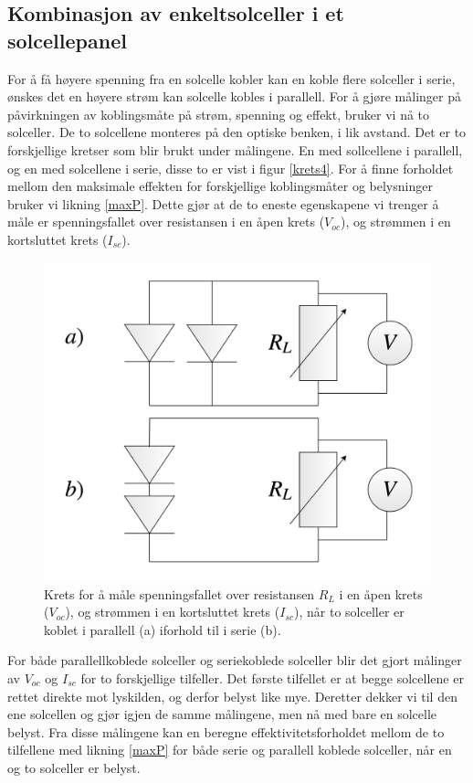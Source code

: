 \documentclass[%
 reprint,
 amsmath,amssymb,
 aps,
 norsk,
 booktabs
]{revtex4-1}
\begin{document}
\subsection{Kombinasjon av enkeltsolceller i et solcellepanel}
For å få høyere spenning fra en solcelle kobler kan en koble flere solceller i serie, ønskes det en høyere strøm kan solcelle kobles i parallell. For å gjøre målinger på påvirkningen av koblingsmåte på strøm, spenning og effekt, bruker vi nå to solceller. De to solcellene monteres på den optiske benken, i lik avstand. Det er to forskjellige kretser som blir brukt under målingene. En med sollcellene i parallell, og en med solcellene i serie, disse to er vist i figur \vref{krets4}. For å finne forholdet mellom den maksimale effekten for forskjellige koblingsmåter og belysninger bruker vi likning \eqref{maxP}. Dette gjør at de to eneste egenskapene vi trenger å måle er spenningsfallet over resistansen i en åpen krets ($V_{oc}$), og strømmen i en kortsluttet krets ($I_{sc}$).\\
\begin{figure}[h!]
  \centering
  \includegraphics[scale=0.16]{krets4.png}
  \caption{Krets for å måle spenningsfallet over resistansen $R_L$ i en åpen krets ($V_{oc}$), og strømmen i en kortsluttet krets ($I_{sc}$), når to solceller er koblet i parallell (a) iforhold til i serie (b).}
  \label{krets4}
\end{figure}
For både parallellkoblede solceller og seriekoblede solceller blir det gjort målinger av $V_{oc}$ og $I_{sc}$ for to forskjellige tilfeller. Det første tilfellet er at begge solcellene er rettet direkte mot lyskilden, og derfor belyst like mye. Deretter dekker vi til den ene solcellen og gjør igjen de samme målingene, men nå med bare en solcelle belyst. Fra disse målingene kan en beregne effektivitetsforholdet mellom de to tilfellene med likning \eqref{maxP} for både serie og parallell koblede solceller, når en og to solceller er belyst.
\end{document}
